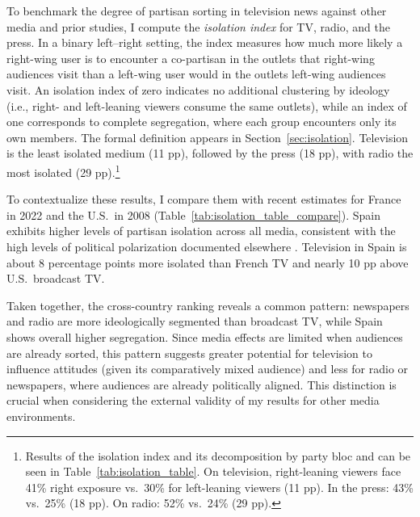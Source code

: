 \documentclass[12pt]{article}
\begin{document}
	
	
	
	
	
	To benchmark the degree of partisan sorting in television news against other media and prior studies, I compute the \emph{isolation index} \citep{gentzkow_isolation} for TV, radio, and the press. In a binary left–right setting, the index measures how much more likely a right-wing user is to encounter a co-partisan in the outlets that right-wing audiences visit than a left-wing user would in the outlets left-wing audiences visit. An isolation index of zero indicates no additional clustering by ideology (i.e., right- and left-leaning viewers consume the same outlets), while an index of one corresponds to complete segregation, where each group encounters only its own members.	The formal definition appears in  Section~\ref{sec:isolation}. Television is the least isolated medium (11 pp), followed by the press (18 pp), with radio the most isolated (29 pp).\footnote{Results of the isolation index and its decomposition by party bloc and can be seen in  Table~\ref{tab:isolation_table}. On television, right-leaning viewers face 41\% right exposure vs.\ 30\% for left-leaning viewers (11 pp). In the press: 43\% vs.\ 25\% (18 pp). On radio: 52\% vs.\ 24\% (29 pp).}
	
	
	To contextualize these results, I compare them with recent estimates for France in 2022 \citep{Dejean2022PartisanSE} and the U.S.\ in 2008 \citep{gentzkow_isolation} (Table~\ref{tab:isolation_table_compare}). Spain exhibits higher levels of partisan isolation across all media, consistent with the high levels of political polarization documented elsewhere \citep{edelman_trust_2023}.
	Television in Spain is about 8 percentage points more isolated than  French TV and nearly 10 pp above U.S.\ broadcast TV.
	
	Taken together, the cross-country ranking reveals a common pattern: newspapers and radio are more ideologically segmented than broadcast TV, while Spain shows overall higher segregation. Since media effects are limited when audiences are already sorted, this pattern suggests greater potential for television to influence attitudes (given its comparatively mixed audience) and less for radio or newspapers, where audiences are already politically aligned. This distinction is crucial when considering the external validity of my results for other media environments.
	
\end{document}
